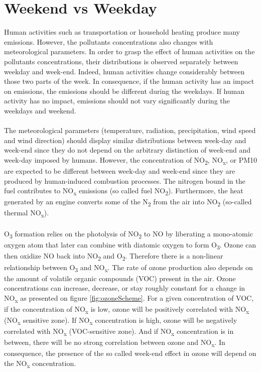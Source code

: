 \documentclass[a4paper, 12pt]{article}
\begin{document}
\section{Weekend vs Weekday} \label{sec:weekend}
    Human activities such as transportation or household heating produce many emissions. However, the pollutants concentrations also changes with meteorological parameters. In order to grasp the effect of human activities on the pollutants concentrations, their distributions is observed separately between weekday and week-end. Indeed, human activities change considerably between those two parts of the week. In consequence, if the human activity has an impact on emissions, the emissions should be different during the weekdays. If human activity has no impact, emissions should not vary significantly during the weekdays and weekend. 
    \\
    \\
    The meteorological parameters (temperature, radiation, precipitation, wind speed and wind direction) should display similar distributions between week-day and week-end since they do not depend on the arbitrary distinction of week-end and week-day imposed by humans. However, the concentration of NO\textsubscript{2}, NO\textsubscript{x}, or PM10 are expected to be different between week-day and week-end since they are produced by human-induced combustion processes. The nitrogen bound in the fuel contributes to NO\textsubscript{x} emissions (so called fuel NO\textsubscript{2}). Furthermore, the heat generated by an engine converts some of the N\textsubscript{2} from the air into NO\textsubscript{2} (so-called thermal NO\textsubscript{x}). 
    \\
    \\
    O\textsubscript{3} formation relies on the photolysis of NO\textsubscript{2} to NO by liberating a mono-atomic oxygen atom that later can combine with diatomic oxygen to form O\textsubscript{3}. Ozone can then oxidize NO back into NO\textsubscript{2} and O\textsubscript{2}. Therefore there is a non-linear relationship between O\textsubscript{3} and NO\textsubscript{x}. The rate of ozone production also depends on the amount of volatile organic compounds (VOC) present in the air. Ozone concentrations can increase, decrease, or stay roughly constant for a change in NO\textsubscript{x} as presented on figure \ref{fig:ozoneScheme}. For a given concentration of VOC, if the concentration of NO\textsubscript{x} is low, ozone will be positively correlated with NO\textsubscript{x} (NO\textsubscript{x} sensitive zone). If NO\textsubscript{x} concentration is high, ozone will be negatively correlated with NO\textsubscript{x} (VOC-sensitive zone). And if NO\textsubscript{x} concentration is in between, there will be no strong correlation between ozone and NO\textsubscript{x}. In consequence, the presence of the so called week-end effect in ozone will depend on the NO\textsubscript{x} concentration. 
\end{document}
